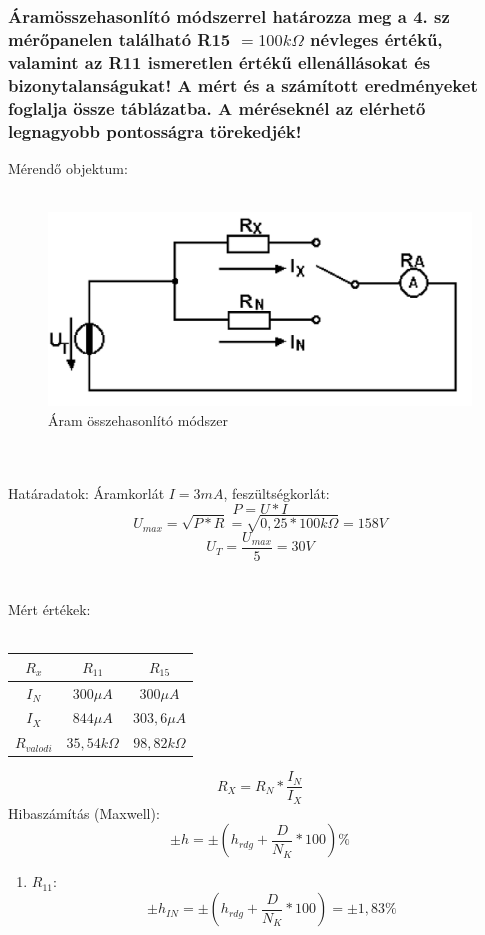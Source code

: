 \documentclass[10pt,a4paper]{article}
\begin{document}
		\subsubsection{Áramösszehasonlító módszerrel határozza meg a 4. sz mérőpanelen
található R15 $= 100 k\Omega$ névleges értékű, valamint az R11 ismeretlen értékű
ellenállásokat és bizonytalanságukat! A mért és a számított eredményeket
foglalja össze táblázatba. A méréseknél az elérhető legnagyobb pontosságra
törekedjék!
}		Mérendő objektum:
		\\\\\begin{figure}[hbtp]
		\centering
		\includegraphics[scale=0.2]{teljes/aram_ossze.png}
		\caption{Áram összehasonlító módszer}
		\end{figure}
		\\\\Határadatok: Áramkorlát $I = 3mA$, feszültségkorlát:$$
		P= U*I$$
		$$U_{max} = \sqrt{P*R} = \sqrt{0,25 * 100 k\Omega} = 158V$$
		$$U_T = \frac{U_{max}}{5} = 30 V $$
		\\\\Mért értékek:\\\\
		\begin{tabular}{|c|c|c|}
		\hline 
		$R_x$ & $R_{11}$ & $R_{15}$ \\ 
		\hline 
		$I_N$ & $300 \mu A$ & $300 \mu A$ \\ 
		\hline 
		$I_X$ & $844 \mu A$ & $303,6 \mu A$ \\ 
		\hline 
		$R_{valodi}$ & $35,54 k\Omega$  & $98,82 k\Omega$ \\ 
		\hline 
		\end{tabular}
		$$R_X = R_N * \frac{I_N}{I_X}$$ 
		Hibaszámítás (Maxwell):
		$$\pm h = \pm \left(h_{rdg} + \frac{D}{N_K}*100\right) \%$$
		\begin{enumerate}
			\item $R_{11}$:
			$$\pm h_{IN} = \pm \left(h_{rdg} + \frac{D}{N_K}*100\right) = \pm 1,83 \%$$
		\end{enumerate}
		
\end{document}
